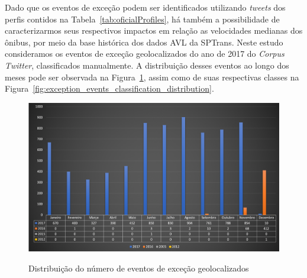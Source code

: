 \documentclass[
	12pt,				%
	oneside,			%
	a4paper,			%
	english,			%
	brazil				%
	]{abntex2ppgsi}
\begin{document}
{{{Dado que os eventos de exceção podem ser identificados utilizando \textit{tweets} dos perfis contidos na Tabela~\ref{tab:oficialProfiles}, há também a possibilidade de caracterizarmos seus respectivos impactos em relação as velocidades medianas dos ônibus, por meio da base histórica dos dados AVL da SPTrans.  Neste estudo consideramos os eventos de exceção geolocalizados do ano de 2017 do \textit{Corpus Twitter}, classificados manualmente. A distribuição desses eventos ao longo dos meses pode ser observada  na Figura~\ref{fig:geolocated_exception_events_distribution}, assim como de suas respectivas classes na Figura~\ref{fig:exception_events_classification_distribution}.



\begin{figure}[!htb]
	\centering
 	  \caption{Distribuição do número de eventos de exceção geolocalizados}
		\includegraphics[width=1\linewidth]{images/geolocated_exception_events_distribution_pt.png}
	\label{fig:geolocated_exception_events_distribution}
\end{figure}

}}}
\end{document}
